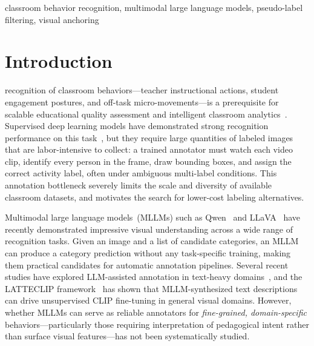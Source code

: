 \documentclass{ieeeaccess}
\begin{document}
\begin{keywords}
classroom behavior recognition, multimodal large language models, pseudo-label filtering, visual anchoring
\end{keywords}

\titlepgskip=-15pt

\maketitle

\section{Introduction}
\label{sec:intro}

 recognition of classroom behaviors---teacher instructional
actions, student engagement postures, and off-task micro-movements---is
a prerequisite for scalable educational quality assessment and
intelligent classroom analytics~\cite{brophy2000teaching,anderson2004classroom}.
Supervised deep learning models have demonstrated strong recognition
performance on this task~\cite{li2022classroom_transformer,zhang2020classroom_cnn},
but they require large quantities of labeled images that are
labor-intensive to collect: a trained annotator must watch each video
clip, identify every person in the frame, draw bounding boxes, and
assign the correct activity label, often under ambiguous multi-label
conditions.
This annotation bottleneck severely limits the scale and diversity of
available classroom datasets, and motivates the search for
lower-cost labeling alternatives.

Multimodal large language models~(MLLMs) such as
Qwen~\cite{bai2023qwen} and LLaVA~\cite{liu2023llava}
have recently demonstrated impressive visual understanding across a
wide range of recognition tasks.
Given an image and a list of candidate categories, an MLLM can produce
a category prediction without any task-specific training, making them
practical candidates for automatic annotation pipelines.
Several recent studies have explored LLM-assisted annotation in
text-heavy domains~\cite{gilardi2023chatgpt,he2023annollm}, and
the LATTECLIP framework~\cite{cao2025latteclip} has shown that
MLLM-synthesized text descriptions can drive unsupervised CLIP
fine-tuning in general visual domains.
However, whether MLLMs can serve as reliable annotators for
\emph{fine-grained, domain-specific} behaviors---particularly those
requiring interpretation of pedagogical intent rather than surface
visual features---has not been systematically studied.
\end{document}
